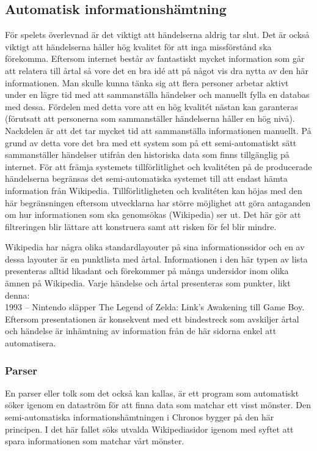 \documentclass[a4paper, 11pt]{article}
\begin{document}
\subsection{Automatisk informationshämtning}
För spelets överlevnad är det viktigt att händelserna aldrig tar slut. Det är också viktigt att händelserna håller hög kvalitet för att inga missförstånd ska förekomma. Eftersom internet består av fantastiskt mycket information som går att relatera till årtal så vore det en bra idé att på något vis dra nytta av den här informationen. Man skulle kunna tänka sig att flera personer arbetar aktivt under en lägre tid med att sammanställa händelser och manuellt fylla en databas med dessa. Fördelen med detta vore att en hög kvalitét nästan kan garanteras (förutsatt att personerna som sammanställer händelserna håller en hög nivå). Nackdelen är att det tar mycket tid att sammanställa informationen manuellt. På grund av detta vore det bra med ett system som på ett semi-automatiskt sätt sammanställer händelser utifrån den historiska data som finns tillgänglig på internet. För att främja systemets tillförlitlighet och kvalitéten på de producerade händelserna begränsas det semi-automatiska systemet till att endast hämta information från Wikipedia. Tillförlitligheten och kvalitéten kan höjas med den här begränsningen eftersom utvecklarna har större möjlighet att göra antaganden om hur informationen som ska genomsökas (Wikipedia) ser ut. Det här gör att filtreringen blir lättare att konstruera samt att risken för fel blir mindre.

Wikipedia har några olika standardlayouter på sina informationssidor och en av dessa layouter är en punktlista med årtal. 
Informationen i den här typen av lista presenteras alltid likadant och förekommer på många undersidor inom olika ämnen på Wikipedia. Varje händelse och årtal presenteras som punkter, likt denna:\\



	1993 – Nintendo släpper The Legend of Zelda: Link's Awakening till Game Boy.\\


Eftersom presentationen är konsekvent med ett bindestreck som avskiljer årtal och händelse är inhämtning av information från de här sidorna enkel att automatisera.

\subsubsection{Parser}
En parser eller tolk som det också kan kallas, är ett program som automatiskt söker igenom en dataström för att finna data som matchar ett visst mönster. Den semi-automatiska informationshämtningen i Chronos bygger på den här principen. I det här fallet söks utvalda Wikipediasidor igenom med syftet att spara informationen som matchar vårt mönster. 
\end{document}
